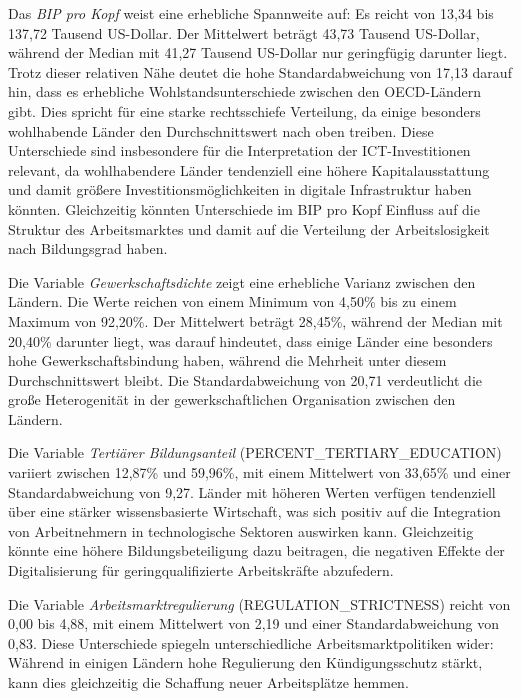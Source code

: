 Das \textit{\ac{BIP} pro Kopf} weist eine erhebliche Spannweite auf: Es reicht von 13,34 bis 
137,72 Tausend US-Dollar. Der Mittelwert beträgt 43,73 Tausend US-Dollar, während der 
Median mit 41,27 Tausend US-Dollar nur geringfügig darunter liegt. Trotz dieser relativen 
Nähe deutet die hohe Standardabweichung von 17,13 darauf hin, dass es erhebliche 
Wohlstandsunterschiede zwischen den \ac{OECD}-Ländern gibt. Dies spricht für eine starke 
rechtsschiefe Verteilung, da einige besonders wohlhabende Länder den Durchschnittswert 
nach oben treiben. Diese Unterschiede sind insbesondere für die Interpretation der 
\ac{ICT}-Investitionen relevant, da wohlhabendere Länder tendenziell eine höhere 
Kapitalausstattung und damit größere Investitionsmöglichkeiten in digitale Infrastruktur 
haben könnten. Gleichzeitig könnten Unterschiede im \ac{BIP} pro Kopf Einfluss auf die 
Struktur des Arbeitsmarktes und damit auf die Verteilung der Arbeitslosigkeit nach 
Bildungsgrad haben.

Die Variable \textit{Gewerkschaftsdichte} zeigt eine erhebliche Varianz zwischen den 
Ländern. Die Werte reichen von einem Minimum von 4,50\% bis zu einem Maximum von 92,20\%. 
Der Mittelwert beträgt 28,45\%, während der Median mit 20,40\% darunter liegt, was darauf 
hindeutet, dass einige Länder eine besonders hohe Gewerkschaftsbindung haben, während die 
Mehrheit unter diesem Durchschnittswert bleibt. Die Standardabweichung von 20,71 
verdeutlicht die große Heterogenität in der gewerkschaftlichen Organisation zwischen den 
Ländern.

Die Variable \textit{Tertiärer Bildungsanteil} (PERCENT\_TERTIARY\_EDUCATION) variiert 
zwischen 12,87\% und 59,96\%, mit einem Mittelwert von 33,65\% und einer Standardabweichung 
von 9,27. Länder mit höheren Werten verfügen tendenziell über eine stärker wissensbasierte 
Wirtschaft, was sich positiv auf die Integration von Arbeitnehmern in technologische Sektoren 
auswirken kann. Gleichzeitig könnte eine höhere Bildungsbeteiligung dazu beitragen, die 
negativen Effekte der Digitalisierung für geringqualifizierte Arbeitskräfte abzufedern.

Die Variable \textit{Arbeitsmarktregulierung} (REGULATION\_STRICTNESS) reicht von 0,00 bis 
4,88, mit einem Mittelwert von 2,19 und einer Standardabweichung von 0,83. Diese Unterschiede 
spiegeln unterschiedliche Arbeitsmarktpolitiken wider: Während in einigen Ländern hohe 
Regulierung den Kündigungsschutz stärkt, kann dies gleichzeitig die Schaffung neuer 
Arbeitsplätze hemmen.

